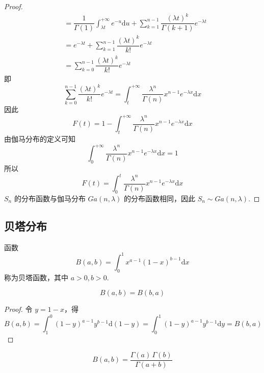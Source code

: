 \begin{proof}
$$\begin{aligned}
        &= \dfrac{1}{\Gamma(1)} \int_{\lambda t}^{+\infty} e^{-u} \text{d}u + \sum_{k=1}^{n-1} \dfrac{(\lambda t)^{k}}{\Gamma(k+1)} e^{-\lambda t} \\
        &= e^{-\lambda t} + \sum_{k=1}^{n-1} \dfrac{(\lambda t)^{k}}{k!} e^{-\lambda t} \\
        &= \sum_{k=0}^{n-1} \dfrac{(\lambda t)^{k}}{k!} e^{-\lambda t}
    \end{aligned}
    $$
    即
    $$
    \sum_{k=0}^{n-1} \dfrac{(\lambda t)^{k}}{k!} e^{-\lambda t} = \int_{t}^{+\infty} \dfrac{\lambda^n}{\Gamma(n)} x^{n-1} e^{-\lambda x} \text{d}x
    $$
    因此
    $$
    F(t) = 1 - \int_{t}^{+\infty} \dfrac{\lambda^n}{\Gamma(n)} x^{n-1} e^{-\lambda x} \text{d}x
    $$
    由伽马分布的定义可知
    $$
    \int_{0}^{+\infty} \dfrac{\lambda^n}{\Gamma(n)} x^{n-1} e^{-\lambda x} \text{d}x = 1
    $$
    所以
    $$
    F(t) = \int_{0}^{t} \dfrac{\lambda^n}{\Gamma(n)} x^{n-1} e^{-\lambda x} \text{d}x
    $$
    $S_n$ 的分布函数与伽马分布 $Ga(n,\lambda)$ 的分布函数相同，因此 $S_n \sim Ga(n,\lambda)$.
\end{proof}

\subsection{贝塔分布}

\begin{definition}
    \indent 函数
    \begin{equation}
        B(a,b) = \int_{0}^{1} x^{a-1} (1-x)^{b-1} \mathrm{d}x
    \end{equation}
    称为{\heiti 贝塔函数}，其中 $a>0, b>0$.
\end{definition}

\begin{property}
    \begin{equation}
        B(a,b) = B(b,a)
    \end{equation}
\end{property}

\begin{proof}
    令 $y = 1-x$，得
    $$
    B(a,b) = \int_{1}^{0} (1-y)^{a-1} y^{b-1} \mathrm{d}(1-y) = \int_{0}^{1} (1-y)^{a-1} y^{b-1} \mathrm{d}y = B(b,a)
    $$
\end{proof}

\begin{property}
    \begin{equation}
        B(a,b) = \dfrac{\Gamma(a) \, \Gamma(b)}{\Gamma(a+b)}
    \end{equation}
\end{property}

